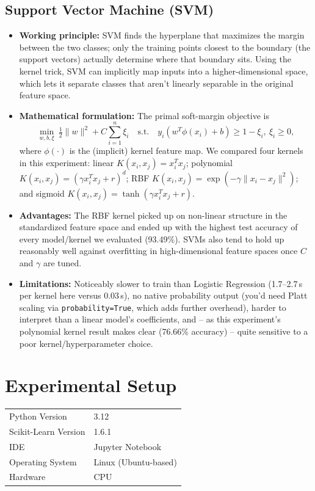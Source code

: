 \documentclass[12pt,a4paper]{article}
\begin{document}
\subsection*{Support Vector Machine (SVM)}
\begin{itemize}
\item \textbf{Working principle:} SVM finds the hyperplane that maximizes the margin
between the two classes; only the training points closest to the boundary (the
support vectors) actually determine where that boundary sits. Using the kernel
trick, SVM can implicitly map inputs into a higher-dimensional space, which lets it
separate classes that aren't linearly separable in the original feature space.
\item \textbf{Mathematical formulation:} The primal soft-margin objective is
\[
\min_{w,b,\xi}\ \tfrac{1}{2}\lVert w \rVert^2 + C\sum_{i=1}^{n}\xi_i
\quad \text{s.t.}\quad y_i(w^T\phi(x_i)+b) \ge 1-\xi_i,\ \xi_i \ge 0,
\]
where $\phi(\cdot)$ is the (implicit) kernel feature map. We compared four kernels in
this experiment: linear $K(x_i,x_j)=x_i^Tx_j$; polynomial
$K(x_i,x_j)=(\gamma x_i^Tx_j + r)^d$; RBF $K(x_i,x_j)=\exp(-\gamma\lVert x_i-x_j\rVert^2)$;
and sigmoid $K(x_i,x_j)=\tanh(\gamma x_i^Tx_j + r)$.
\item \textbf{Advantages:} The RBF kernel picked up on non-linear structure in the
standardized feature space and ended up with the highest test accuracy of every
model/kernel we evaluated (93.49\%). SVMs also tend to hold up reasonably well
against overfitting in high-dimensional feature spaces once $C$ and $\gamma$ are
tuned.
\item \textbf{Limitations:} Noticeably slower to train than Logistic Regression
(1.7--2.7\,s per kernel here versus 0.03\,s), no native probability output (you'd need
Platt scaling via \texttt{probability=True}, which adds further overhead), harder to
interpret than a linear model's coefficients, and -- as this experiment's polynomial
kernel result makes clear (76.66\% accuracy) -- quite sensitive to a poor
kernel/hyperparameter choice.
\end{itemize}
 
\section{Experimental Setup}
\begin{tabular}{ll}
\toprule
Python Version & 3.12 \\
Scikit-Learn Version & 1.6.1 \\
IDE & Jupyter Notebook \\
Operating System & Linux (Ubuntu-based) \\
Hardware & CPU \\
\bottomrule
\end{tabular}
 
\end{document}
